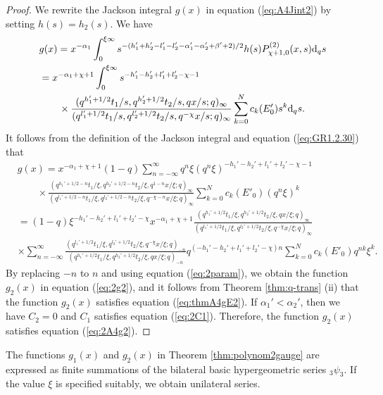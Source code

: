 \documentclass[12pt]{amsart}
\numberwithin{equation}{section}
\theoremstyle{definition}
\theoremstyle{remark}
\begin{document}
\begin{proof}
We rewrite the Jackson integral $g(x)$ in equation (\ref{eq:A4Jint2}) by setting $h(s)=h_2(s)$.
We have
\begin{align*}
 & g(x) = x^{-\alpha_{1}} \int_{0}^{\xi \infty} s^{-(h_{1}' + h_{2}' - l_{1}' - l_{2}' - \alpha_{1}' - \alpha_{2}' + \beta' + 2)/2} h(s) P_{\chi +1, 0 }^{(2)} (x, s) {\rm{d}}_{q}s \\
  &= x^{-\alpha_{1} + \chi + 1}\int_{0}^{\xi \infty} s^{- h_{1}' - h_{2}' + l_{1}' + l_{2}' - \chi - 1} \\
  &\qquad \times \frac{(q^{h_{1}' + 1/2}t_{1}/s, q^{h_{2}' + 1/2}t_{2}/s, qx/s; q)_\infty}{(q^{l_{1}' + 1/2}t_{1}/s, q^{l_{2}' + 1/2}t_{2}/s, q^{-\chi} x/s; q)_\infty} \sum_{k = 0}^{N} c_{k} (E'_0) s^{k} {\rm{d}}_{q}s . 
\end{align*}
It follows from the definition of the Jackson integral and equation (\ref{eq:GR1.2.30}) that
\begin{align*}
  &g(x) = x^{-\alpha_{1} + \chi + 1} (1 - q) \sum_{n = -\infty}^{\infty} q^{n}\xi (q^{n}\xi)^{-h_{1}' - h_{2}' + l_{1}' + l_{2}' - \chi - 1} \\
  & \qquad \times \frac{(q^{h_{1}' + 1/2 - n}t_{1}/\xi, q^{h_{2}' + 1/2 - n}t_{2}/\xi, q^{1 - n}x/\xi; q)_\infty}{(q^{l_{1}' + 1/2 - n}t_{1}/\xi, q^{l_{2}' + 1/2 - n}t_{2}/\xi, q^{-\chi - n} x/\xi; q)_\infty} \sum_{k = 0}^{N} c_{k} (E'_0) (q^{n}\xi)^{k} \\
  &= (1 - q) \xi^{-h_{1}' - h_{2}' + l_{1}' + l_{2}' - \chi} x^{-\alpha_{1} + \chi + 1} \frac{(q^{h_{1}' + 1/2}t_{1}/\xi, q^{h_{2}' + 1/2}t_{2}/\xi, qx/\xi; q)_\infty}{(q^{l_{1}' + 1/2}t_{1}/\xi, q^{l_{2}' + 1/2}t_{2}/\xi, q^{-\chi} x/\xi; q)_\infty} \\
  &\times \sum_{n = -\infty}^{\infty}  \frac{(q^{l_{1}' + 1/2}t_{1}/\xi, q^{l_{2}' + 1/2}t_{2}/\xi, q^{-\chi} x/\xi; q)_{-n}}{(q^{h_{1}' + 1/2}t_{1}/\xi, q^{h_{2}' + 1/2}t_{2}/\xi, qx/\xi; q)_{-n}} q^{(-h_{1}' - h_{2}' + l_{1}' + l_{2}' - \chi)n} \sum_{k = 0}^{N} c_{k} (E'_0) q^{nk} \xi^{k} .
\end{align*}
By replacing $-n$ to $n$ and using equation (\ref{eq:2param}), we obtain the function $g_2 (x)$ in equation (\ref{eq:2g2}), and it follows from Theorem \ref{thm:q-trans} (ii) that the function $g_2 (x)$ satisfies equation (\ref{eq:thmA4gE2}).
If $\alpha_{1}' < \alpha_{2}'$, then we have $C_2=0$ and $C_1$ satisfies equation (\ref{eq:2C1}).
Therefore, the function $g_2 (x)$ satisfies equation (\ref{eq:2A4g2}).
\end{proof}

The functions $g_1(x)$ and $g_2 (x) $ in Theorem \ref{thm:polynom2gauge} are expressed as finite summations of the bilateral basic hypergeometric series $_3\psi _3$.
If the value $\xi$ is specified suitably, we obtain unilateral series.
\end{document}
